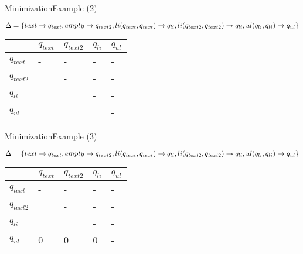 \documentclass{beamer}
\begin{document}
\begin{frame}{Minimization}{Example (2)}
	\begin{example}
		\(\Delta = \{		text \rightarrow q_{text},
							\newline
							empty \rightarrow q_{text2},
							\newline
							li(q_{text}, q_{text}) \rightarrow q_{li},
							\newline
							li(q_{text2}, q_{text2}) \rightarrow q_{li},
							\newline
							ul(q_{li}, q_{li}) \rightarrow q_{ul}
		\}\)
	\end{example}
	\begin{center}
  		\begin{tabular}{| l |  l | l | l |  l  |}
    			\hline
   			 			&	 \(q_{text}\) 	& 	\(q_{text2}\) 	& 	\(q_{li}\)  	& 	\(q_{ul}\) 	\\ \hline
   			 \(q_{text}\) 	&	-			&	-			&	-		&	-		\\ \hline
   			 \(q_{text2}\) 	&				&	-			&	-		&	-		\\ \hline
			 \(q_{li}\) 		&				&				&	-		&	-		\\ \hline
			 \(q_{ul}\) 		&				&				&			&	-		\\
    			\hline
 		 \end{tabular}
	\end{center}
\end{frame}

\begin{frame}{Minimization}{Example (3)}
	\begin{example}
		\(\Delta = \{		text \rightarrow q_{text},
							\newline
							empty \rightarrow q_{text2},
							\newline
							li(q_{text}, q_{text}) \rightarrow q_{li},
							\newline
							li(q_{text2}, q_{text2}) \rightarrow q_{li},
							\newline
							ul(q_{li}, q_{li}) \rightarrow q_{ul}
		\}\)
	\end{example}
	\begin{center}
  		\begin{tabular}{| l |  l | l | l |  l  |}
    			\hline
   			 			&	 \(q_{text}\) 	& 	\(q_{text2}\) 	& 	\(q_{li}\)  	& 	\(q_{ul}\) 	\\ \hline
   			 \(q_{text}\) 	&	-			&	-			&	-		&	-		\\ \hline
   			 \(q_{text2}\) 	&				&	-			&	-		&	-		\\ \hline
			 \(q_{li}\) 		&				&				&	-		&	-		\\ \hline
			 \(q_{ul}\) 		&	0			&	0			&	0		&	-		\\
    			\hline
 		 \end{tabular}
	\end{center}
\end{frame}
\end{document}
